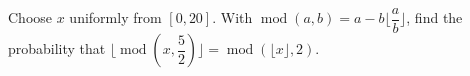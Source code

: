 Choose $x$ uniformly from $[0,20]$. With $\operatorname{mod}(a,b)=a-b\lfloor \dfrac{a}{b}\rfloor$, find the probability that $\lfloor\operatorname{mod}(x,\dfrac{5}{2})\rfloor=\operatorname{mod}(\lfloor x\rfloor,2)$.
